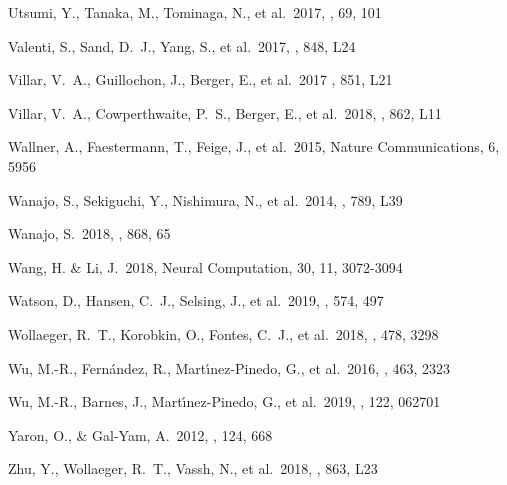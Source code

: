 \documentclass[twocolumn]{aastex63}
\begin{document}
\begin{thebibliography}{}
 Utsumi, Y., Tanaka, M., Tominaga, N., et al.\ 2017, \pasj, 69, 101

 Valenti, S., Sand, D.~J., Yang, S., et al.\ 2017, \apjl, 848, L24

Villar, V.~A., Guillochon, J., Berger, E., et al.\ 2017 \aj, 851, L21

 Villar, V.~A., Cowperthwaite, P.~S., Berger, E., et al.\ 2018, \apjl, 862, L11


 Wallner, A., Faestermann, T., Feige, J., et al.\ 2015, Nature Communications, 6, 5956

 Wanajo, S., Sekiguchi, Y., Nishimura, N., et al.\ 2014, \apjl, 789, L39

 Wanajo, S.\ 2018, \apj, 868, 65

 Wang, H. \& Li, J.\ 2018, Neural Computation, 30, 11, 3072-3094

 Watson, D., Hansen, C.~J., Selsing, J., et al.\ 2019, \nat, 574, 497

 Wollaeger, R.~T., Korobkin, O., Fontes, C.~J., et al.\ 2018, \mnras, 478, 3298

 Wu, M.-R., Fern{\'a}ndez, R., Mart{\'\i}nez-Pinedo, G., et al.\ 2016, \mnras, 463, 2323

 Wu, M.-R., Barnes, J., Mart{\'\i}nez-Pinedo, G., et al.\ 2019, \prl, 122, 062701

 Yaron, O., \& Gal-Yam, A.\ 2012, \pasp, 124, 668

 Zhu, Y., Wollaeger, R.~T., Vassh, N., et al.\ 2018, \apjl, 863, L23

\end{thebibliography}

\appendix{}
\end{document}
